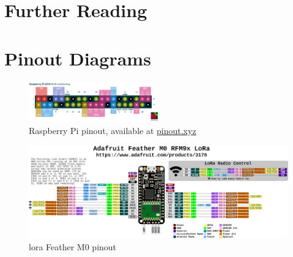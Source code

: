 \clearpage
\begin{appendices}

\chapter{Further Reading}
\printbibliography[heading=none,notcategory=cited]

\chapter{Pinout Diagrams}

\vfill

\begin{figure}[H]
    \centering
    \includegraphics[width=0.5\textwidth]{../figures/raspberry-pi-pinout.png}
    \caption[Raspberry Pi pinout]{Raspberry Pi pinout, available at \href{https://pinout.xyz}{pinout.xyz \faExternalLink}}
    \label{fig:raspipinout}
\end{figure}

\vfill

\begin{figure}[H]
    \centering
    \includegraphics[width=\textwidth]{../figures/featherm0pinout.png}
    \caption[LoRa Feather M0 pinout]{\gls{lora} Feather M0 pinout \cite{img:m0}}
    \label{fig:m0pinout}
\end{figure}

\vfill


\end{appendices}
